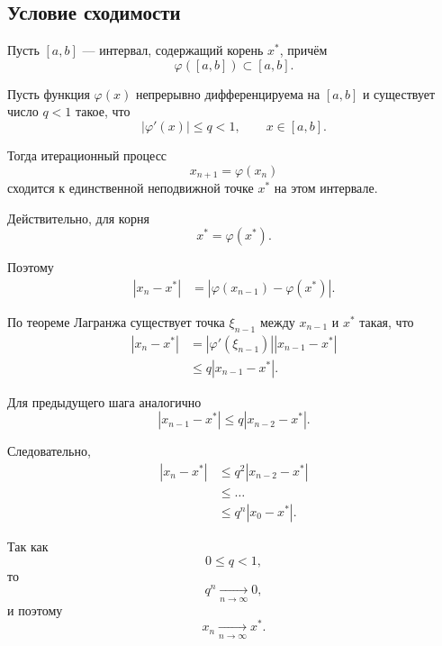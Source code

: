 \documentclass[../final.tex]{subfiles}
\begin{document}
\subsection{Условие сходимости}

Пусть $[a,b]$ --- интервал, содержащий корень $x^*$, причём
%
\begin{equation*}
    \varphi([a,b])\subset[a,b].
\end{equation*}

Пусть функция $\varphi(x)$ непрерывно дифференцируема на $[a,b]$ и
существует число $q<1$ такое, что
%
\begin{equation*}
    |\varphi'(x)|\leq q<1,
    \qquad
    x\in[a,b].
\end{equation*}

Тогда итерационный процесс
%
\begin{equation*}
    x_{n+1}=\varphi(x_n)
\end{equation*}
%
сходится к единственной неподвижной точке $x^*$ на этом интервале.

Действительно, для корня
%
\begin{equation*}
    x^*=\varphi(x^*).
\end{equation*}

Поэтому
%
\begin{align*}
    |x_n-x^*|
    &=
    |\varphi(x_{n-1})-\varphi(x^*)|.
\end{align*}

По теореме Лагранжа существует точка $\xi_{n-1}$ между
$x_{n-1}$ и $x^*$ такая, что
%
\begin{align*}
    |x_n-x^*|
    &=
    |\varphi'(\xi_{n-1})|
    |x_{n-1}-x^*|
    \\
    &\leq
    q|x_{n-1}-x^*|.
\end{align*}

Для предыдущего шага аналогично
%
\begin{equation*}
    |x_{n-1}-x^*|
    \leq
    q|x_{n-2}-x^*|.
\end{equation*}

Следовательно,
%
\begin{align*}
    |x_n-x^*|
    &\leq
    q^2|x_{n-2}-x^*|
    \\
    &\leq
    \ldots
    \\
    &\leq
    q^n|x_0-x^*|.
\end{align*}

Так как
%
\begin{equation*}
    0\leq q<1,
\end{equation*}
%
то
%
\begin{equation*}
    q^n\underset{n\to\infty}{\longrightarrow}0,
\end{equation*}
%
и поэтому
%
\begin{equation*}
    x_n\underset{n\to\infty}{\longrightarrow}x^*.
\end{equation*}
\end{document}
